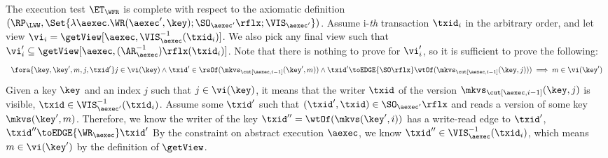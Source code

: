 The execution test $\ET_\WFR$ is complete with respect to the axiomatic definition 
\( (\RP_{\LWW}, \Set{\lambda \aexec. \WR(\aexec', \key) ; \SO_{\aexec'}\rflx ; \VIS_{\aexec'} })\).
Assume i-\emph{th} transaction \( \txid_i \) in the arbitrary order,
and let view \( \vi_{i} = \getView[\aexec, \VIS^{-1}_{\aexec}(\txid_{i})] \).
We also pick any final view such that \( \vi'_{i} \subseteq \getView[\aexec, (\AR^{-1}_{\aexec})\rflx(\txid_{i})] \).
Note that there is nothing to prove for \( \vi'_i \),
so it is sufficient to prove the following:
\[
    \begin{array}{l}
    \fora{\key, \key', m, j, \txid'} j \in \vi(\key)
    \land \txid' \in \rsOf(\mkvs_{\cut[\aexec, i-1]}(\key', m)) \land \txid' {\toEDGE{\SO\rflx}} \wtOf(\mkvs_{\cut[\aexec, i-1]}(\key, j)) ) 
    \implies m \in \vi(\key')
    \end{array}
\]
Given a key \( \key \) and an index \( j \) such that \( j \in \vi(\key) \), 
it means that the writer \( \txid \) of the version \( \mkvs_{\cut[\aexec, i-1]}(\key, j) \) is visible, \ie \( \txid \in \VIS_{\aexec'}^{-1}(\txid_i) \).
Assume some \( \txid' \) such that \( (\txid', \txid) \in \SO_{\aexec'}\rflx \) and reads a version of some key \( \mkvs(\key',m) \).
Therefore, we know the writer of the key \( \txid'' = \wtOf(\mkvs(\key',i)) \) has a write-read edge to \( \txid' \), \ie \( \txid'' \toEDGE{\WR_\aexec} \txid'\) 
By the constraint on abstract execution \( \aexec \), we know \( \txid'' \in \VIS^{-1}_{\aexec}(\txid_{i}) \),
which means \( m \in \vi(\key')\) by the definition of \( \getView \).
